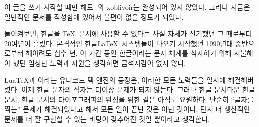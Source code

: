 \documentclass[
	12pt,
	a4paper,
	kosection,
	footnote,
	nobookmarks,
	microtype,
]{oblivoir}
\newcommand\xobclass{x\-ob\-liv\-oir\oblivoirallowbreak}
\def\xetexko{\XeTeX-\ko}
\begin{document}
이 글을 쓰기 시작할 때만 해도 \xetexko{}와 \xobclass{}는
완성되어 있지 않았다. 그러나 지금은 일반적인 문서를 작성함에 있어서
불편이 없을 정도가 되었다.

\bigskip

돌이켜보면, 한글을 \TeX\ 문서에 사용할 수 있다는 사실 자체가
신기했던 그 때로부터 20여년이 흘렀다. 본격적인 한글\LaTeX\ 시스템들이
나오기 시작했던 1990년대 중반으로부터 헤아려도 십수 년,
이 기간 동안 한글이라는 문자 체계를 식자하기 위해 지불해야 했던
엄청난 노력과 자원을 생각하면 금석지감이 없지 않다.

Lua\TeX 과 \XeTeX 이라는 유니코드 텍 엔진의 등장은, 이러한 모든
노력들을 일시에 해결해버렸다. 이제 한글 문자의 식자는 더이상
문제가 되지 않는다.
그러나 한글 문서다운 한글 문서, 한글 문서의 타이포그래피의 완성을
위한 길은 아직도 요원하다. 단순히 “글자를 찍는” 문제가 해결되었다고
해서 모든 일이 끝난 것은 아닌 것이다. 단지 더 생산적인 문제를
더 잘 구현할 수 있는 바탕이 갖추어진 것일 뿐이라고 생각한다.







\end{document}

